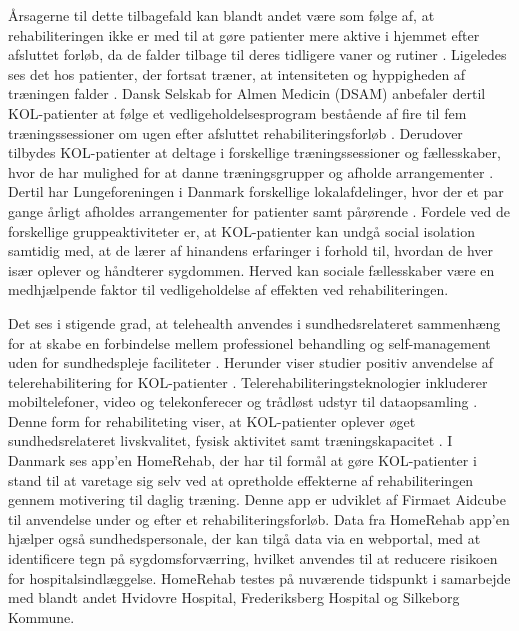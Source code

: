 Årsagerne til dette tilbagefald kan blandt andet være som følge af, at rehabiliteringen ikke er med til at gøre patienter mere aktive i hjemmet efter afsluttet forløb, da de falder tilbage til deres tidligere vaner og rutiner \cite{Egan2012}. Ligeledes ses det hos patienter, der fortsat træner, at intensiteten og hyppigheden af træningen falder \cite{Ringbaek2008}. 
Dansk Selskab for Almen Medicin (DSAM) anbefaler dertil KOL-patienter
at følge et vedligeholdelsesprogram bestående af fire til fem træningssessioner om ugen
efter afsluttet rehabiliteringsforløb \cite{dsam2016}. Derudover tilbydes KOL-patienter at deltage i forskellige træningssessioner og fællesskaber, hvor de har mulighed for at danne træningsgrupper og afholde arrangementer \cite{Sundhedsstyrelsen2015}. Dertil har Lungeforeningen i Danmark forskellige lokalafdelinger, hvor der et par gange årligt afholdes arrangementer for patienter samt pårørende \cite{Lungeforeningen2016}.
Fordele ved de forskellige gruppeaktiviteter er, at KOL-patienter kan undgå social isolation samtidig med, at de lærer af hinandens erfaringer i forhold til, hvordan de hver især oplever og håndterer sygdommen. Herved kan sociale fællesskaber være en medhjælpende faktor til vedligeholdelse af effekten ved rehabiliteringen.\cite{dsam2016}

Det ses i stigende grad, at telehealth anvendes i sundhedsrelateret sammenhæng for at skabe en forbindelse mellem professionel behandling og self-management uden for sundhedspleje faciliteter \cite{Williams2014,WHOtelehealth2017}. Herunder viser studier positiv anvendelse af telerehabilitering for KOL-patienter \cite{Zanaboni2017}. Telerehabiliteringsteknologier inkluderer mobiltelefoner, video og telekonferecer og trådløst udstyr til dataopsamling \cite{Zanaboni2017,WHOrehab2017}. Denne form for rehabiliteting viser, at KOL-patienter oplever øget sundhedsrelateret livskvalitet, fysisk aktivitet samt træningskapacitet \cite{Zanaboni2017}. 
I Danmark ses app'en HomeRehab, der har til formål at gøre KOL-patienter i stand til at varetage sig selv ved at opretholde effekterne af rehabiliteringen gennem motivering til daglig træning. Denne app er udviklet af Firmaet Aidcube til anvendelse under og efter et rehabiliteringsforløb. Data fra HomeRehab app'en hjælper også sundhedspersonale, der kan tilgå data via en webportal, med at identificere tegn på sygdomsforværring, hvilket anvendes til at reducere risikoen for hospitalsindlæggelse. HomeRehab testes på nuværende tidspunkt i samarbejde med blandt andet Hvidovre Hospital, Frederiksberg Hospital og Silkeborg Kommune.\cite{HealthcareDenmark2017} 

